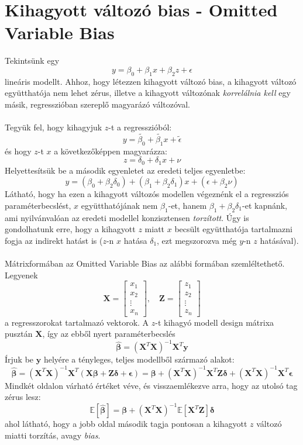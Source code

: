 \documentclass[14p]{report}
\def\pmb{\boldsymbol}
\def\ebeta{\hat{\pmb{\beta}}}
\def\e{\epsilon}
\begin{document}
	\section{Kihagyott változó bias - Omitted Variable Bias}
	Tekintsünk egy 
	\[
		y = \beta_0 + \beta_1 x + \beta_2 z + \e
	\]
	lineáris modellt. Ahhoz, hogy létezzen kihagyott változó bias, a kihagyott változó együtthatója nem lehet zérus, illetve a kihagyott változónak \emph{korrelálnia kell} egy másik, regresszióban szereplő magyarázó változóval.
	\\
	\\
	Tegyük fel, hogy kihagyjuk $z$-t a regresszióból:
	\[
		y = \tilde{\beta_0} + \tilde{\beta_1} x + \tilde{\e}
	\]
	és hogy $z$-t $x$ a következőképpen magyarázza:
	\[
		z = \delta_0 + \delta_1 x + \nu
	\]
	Helyettesítsük be a második egyenletet az eredeti teljes egyenletbe:
	\[
		y = (\beta_0 + \beta_2 \delta_0) + (\beta_1 + \beta_2 \delta_1)x + (\e + \beta_2 \nu)
	\]
	Látható, hogy ha ezen a kihagyott változós modellen végeznénk el a regressziós paraméterbecslést, $x$ együtthatójának nem $\beta_1$-et, hanem $\beta_1 + \beta_2 \delta_1$-et kapnánk, ami nyilvánvalóan az eredeti modellel konzisztensen \emph{torzított}. Úgy is gondolhatunk erre, hogy a kihagyott $z$ miatt $x$ becsült együtthatója tartalmazni fogja az indirekt hatást is ($z$-n $x$ hatása $\delta_1$, ezt megszorozva még $y$-n $z$ hatásával).
	\\
	\\
	Mátrixformában az Omitted Variable Bias az alábbi formában szemléltethető. Legyenek
	\[
		\pmb{X} =
		\begin{bmatrix}
		x_1 \\
		x_2 \\
		\vdots \\
		x_n
		\end{bmatrix}, \quad
		\pmb{Z} =
		\begin{bmatrix}
		z_1 \\
		z_2 \\
		\vdots \\
		z_n 
		\end{bmatrix}
	\]
	a regresszorokat tartalmazó vektorok. A $z$-t kihagyó modell design mátrixa pusztán $\pmb{X}$, így az ebből nyert paraméterbecslés
	\[
		\ebeta = (\pmb{X}^T\pmb{X})^{-1}\pmb{X}^T\pmb{y}
	\] 
	Írjuk be $\pmb{y}$ helyére a tényleges, teljes modellből származó alakot:
	\[
		\ebeta = (\pmb{X}^T\pmb{X})^{-1}\pmb{X}^T(\pmb{X}\pmb{\beta} + \pmb{Z}\pmb{\delta} + \pmb{\e}) = \pmb{\beta} + (\pmb{X}^T\pmb{X})^{-1}\pmb{X}^T\pmb{Z}\pmb{\delta} + (\pmb{X}^T\pmb{X})^{-1}\pmb{X}^T\pmb{\e}
	\]
	Mindkét oldalon várható értéket véve, és visszaemlékezve arra, hogy az utolsó tag zérus lesz:
	\[
		\mathbb{E}[\ebeta] = \pmb{\beta} + (\pmb{X}^T\pmb{X})^{-1}\mathbb{E}[\pmb{X}^T\pmb{Z}]\pmb{\delta}
	\]
	ahol látható, hogy a jobb oldal második tagja pontosan a kihagyott $z$ változó miatti torzítás, avagy \emph{bias}.
	
\end{document}

